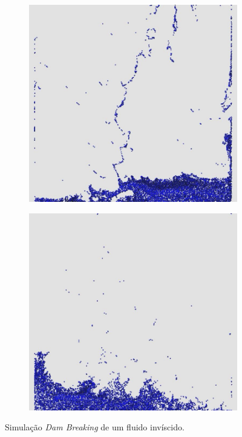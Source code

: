 \documentclass[12pt,a4paper,dvipsnames]{article}
\begin{document}
\begin{figure}[!ht]
\begin{subfigure}[!h]{0.3\textwidth}
	\end{subfigure}
	\begin{subfigure}[!h]{0.3\textwidth} \centering
		\includegraphics[width=\textwidth]{DB/DB-010.jpg}
	\end{subfigure}
	\begin{subfigure}[!h]{0.3\textwidth} \centering
		\includegraphics[width=\textwidth]{DB/DB-011.jpg}
	\end{subfigure}
    \caption{Simulação \textit{Dam Breaking} de um fluido invíscido.}
    \label{fig:dambreaking}
\end{figure}
\end{document}
